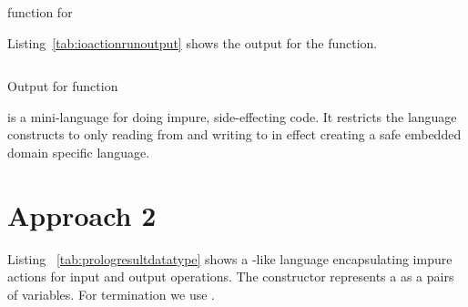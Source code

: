 \documentclass[thesis-solanki.tex]{subfiles}
\begin{document}
\begin{code-list}[H]
\begin{singlespace}
\inputminted{haskell}{haskell-proto4-ioaction-run.hs}
\end{singlespace}
\caption{ function for }
\label{tab:ioactionrun}
\end{code-list}

Listing~\ref{tab:ioactionrunoutput} shows the output for the  function.

\begin{code-list}[H]
\begin{singlespace}
\inputminted{haskell}{haskell-proto4-ioaction-run-output.hs}
\end{singlespace}
\caption{Output for  function}
\label{tab:ioactionrunoutput}
\end{code-list}

 is a mini-language for doing impure, side-effecting code.
It restricts the language constructs to only reading from  and writing to
 in effect creating a safe embedded domain specific language.

\begin{comment}
\begin{code-list}[H]
\begin{singlespace}
  \inputminted[linenos]{haskell}{haskell-proto4-purvey-wincer.hs}
\end{singlespace}
\caption{\protect\haskellConstruct{IOAction} definitions}
\label{lis:IOAction}
\end{code-list}
\end{comment}


\section{Approach 2}

\begin{comment}
  So when the program is getting interpreted the interpreter encounters an IO operation which then gets
  "interpreted" to the above and it continues normally.

The interpreted program is still pure since the IO actions have not been executed 

if the running is done inside a monad then the IO still is pure.
\end{comment}


Listing ~\ref{tab:prologresultdatatype} shows a -like language encapsulating impure actions for
input and output operations.
The  constructor represents a  as a pairs of variables.
For termination we use .
\end{document}
